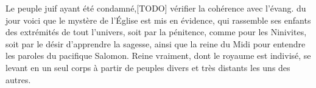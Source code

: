 Le peuple juif ayant été condamné,[TODO] vérifier la cohérence avec l'évang. du jour
	voici que le mystère de l’Église est mis en évidence,
	qui rassemble ses enfants des extrémités de tout l’univers,
	soit par la pénitence, comme pour les Ninivites,
	soit par le désir d’apprendre la sagesse,
	ainsi que la reine du Midi pour entendre les paroles du pacifique Salomon.
Reine vraiment, dont le royaume est indivisé,
	se levant en un seul corps à partir de peuples divers
		et très distants les uns des autres.
